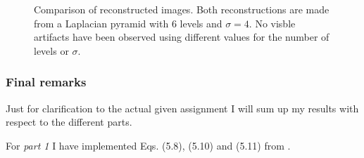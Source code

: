 \documentclass[a4paper, 10pt, final]{article}
\begin{document}
\begin{figure}[!h]
    \centering
    \hspace{1em}
    \hspace{1em}
    \caption{Comparison of reconstructed images. Both reconstructions
    are made from a Laplacian pyramid with 6 levels and $\sigma = 4$. No
    visble artifacts have been observed using different values for the
    number of levels or $\sigma$.}
    \label{reconstructions}
\end{figure}

\subsubsection*{Final remarks}
Just for clarification to the actual given assignment I will sum up my
results with respect to the different parts.

For \emph{part 1} I have implemented Eqs. (5.8), (5.10) and (5.11) from
\citep{jahne-digital}.
\end{document}
